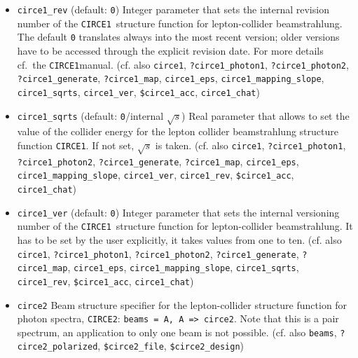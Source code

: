 \documentclass[12pt]{book}
\newcommand{\ttt}[1]{\texttt{#1}}
\newcommand{\circeone}{\texttt{CIRCE1}}
\newcommand{\circetwo}{\texttt{CIRCE2}}
\begin{document}
\begin{itemize}
\ttt{circe1\_sqrts},  \ttt{?circe1\_generate}, \ttt{?circe1\_map},
\ttt{circe1\_eps}, \newline \ttt{circe1\_mapping\_slope}, \ttt{circe1\_ver},
\ttt{circe1\_rev}, \ttt{\$circe1\_acc}, \ttt{circe1\_chat})
\item
\ttt{circe1\_rev} \qquad (default: \ttt{0}) \newline
Integer parameter that sets the internal revision number of the
\circeone\ structure function for lepton-collider beamstrahlung. The
default \ttt{0} translates always into the most recent version; older
versions have to be accessed through the explicit revision date. For
more details cf.~the \circeone manual.
(cf. also \ttt{circe1}, \ttt{?circe1\_photon1},
\ttt{?circe1\_photon2},  \ttt{?circe1\_generate}, \ttt{?circe1\_map},
\ttt{circe1\_eps}, \ttt{circe1\_mapping\_slope},
\ttt{circe1\_sqrts}, \ttt{circe1\_ver}, \ttt{\$circe1\_acc},
\ttt{circe1\_chat}) 
\item
\ttt{circe1\_sqrts} \qquad (default: \ttt{0}/internal $\sqrt{s}$)
\newline 
Real parameter that allows to set the value of the collider energy for
the lepton collider beamstrahlung structure function \circeone. If not
set, $\sqrt{s}$ is taken. (cf. also \ttt{circe1}, \ttt{?circe1\_photon1},
\ttt{?circe1\_photon2},  \ttt{?circe1\_generate}, \ttt{?circe1\_map},
\ttt{circe1\_eps}, \newline \ttt{circe1\_mapping\_slope},
\ttt{circe1\_ver}, \ttt{circe1\_rev}, \ttt{\$circe1\_acc},
\ttt{circe1\_chat}) 
\item
\ttt{circe1\_ver} \qquad (default: \ttt{0}) \newline
Integer parameter that sets the internal versioning number of the
\circeone\ structure function for lepton-collider beamstrahlung. It
has to be set by the user explicitly, it takes values from one to ten.
(cf. also \ttt{circe1}, \ttt{?circe1\_photon1},
\ttt{?circe1\_photon2},  \ttt{?circe1\_generate}, \ttt{?circe1\_map},
\ttt{circe1\_eps}, \ttt{circe1\_mapping\_slope},
\ttt{circe1\_sqrts}, \ttt{circe1\_rev}, \ttt{\$circe1\_acc},
\ttt{circe1\_chat}) 
\item
\ttt{circe2} \newline
Beam structure specifier for the lepton-collider structure function
for photon spectra, \circetwo: \ttt{beams = A, A => circe2}. Note that
this is a pair spectrum, an application to only one beam is not
possible. (cf. also \ttt{beams}, \ttt{?circe2\_polarized},
\ttt{\$circe2\_file}, \ttt{\$circe2\_design})

\end{itemize}
\end{document}
